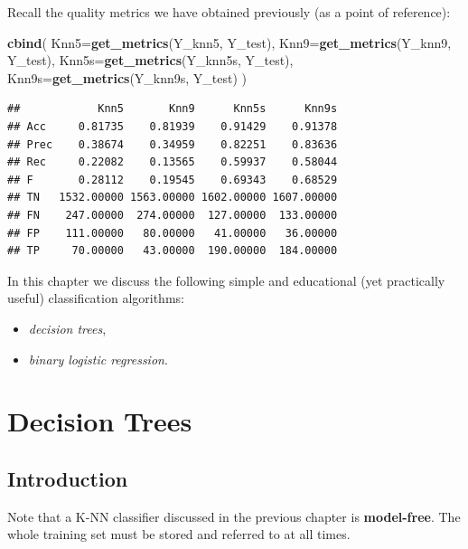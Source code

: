 \documentclass[10pt,b5paper,krantz1]{krantz}
\newenvironment{Shaded}{\begin{snugshade}}{\end{snugshade}}
\newcommand{\DataTypeTok}[1]{\textcolor[rgb]{0.27,0.27,0.27}{#1}}
\newcommand{\KeywordTok}[1]{\textcolor[rgb]{0.27,0.27,0.27}{\textbf{#1}}}
\newcommand{\NormalTok}[1]{#1}
\providecommand{\tightlist}{%
  \setlength{\itemsep}{0pt}\setlength{\parskip}{0pt}}
\begin{document}
Recall the quality metrics we have obtained previously (as a point of reference):

\begin{Shaded}
\begin{Highlighting}[]
\KeywordTok{cbind}\NormalTok{(}
    \DataTypeTok{Knn5=}\KeywordTok{get_metrics}\NormalTok{(Y_knn5, Y_test),}
    \DataTypeTok{Knn9=}\KeywordTok{get_metrics}\NormalTok{(Y_knn9, Y_test),}
    \DataTypeTok{Knn5s=}\KeywordTok{get_metrics}\NormalTok{(Y_knn5s, Y_test),}
    \DataTypeTok{Knn9s=}\KeywordTok{get_metrics}\NormalTok{(Y_knn9s, Y_test)}
\NormalTok{)}
\end{Highlighting}
\end{Shaded}

\begin{verbatim}
##            Knn5       Knn9      Knn5s      Knn9s
## Acc     0.81735    0.81939    0.91429    0.91378
## Prec    0.38674    0.34959    0.82251    0.83636
## Rec     0.22082    0.13565    0.59937    0.58044
## F       0.28112    0.19545    0.69343    0.68529
## TN   1532.00000 1563.00000 1602.00000 1607.00000
## FN    247.00000  274.00000  127.00000  133.00000
## FP    111.00000   80.00000   41.00000   36.00000
## TP     70.00000   43.00000  190.00000  184.00000
\end{verbatim}

In this chapter we discuss the following simple and educational
(yet practically useful)
classification algorithms:

\begin{itemize}
\tightlist
\item
  \emph{decision trees},
\item
  \emph{binary logistic regression}.
\end{itemize}

\hypertarget{decision-trees}{%
\section{Decision Trees}\label{decision-trees}}

\hypertarget{introduction-6}{%
\subsection{Introduction}\label{introduction-6}}

Note that a K-NN classifier discussed in the previous chapter
is \textbf{model-free}.
The whole training set must be stored and referred to at all times.
\end{document}
